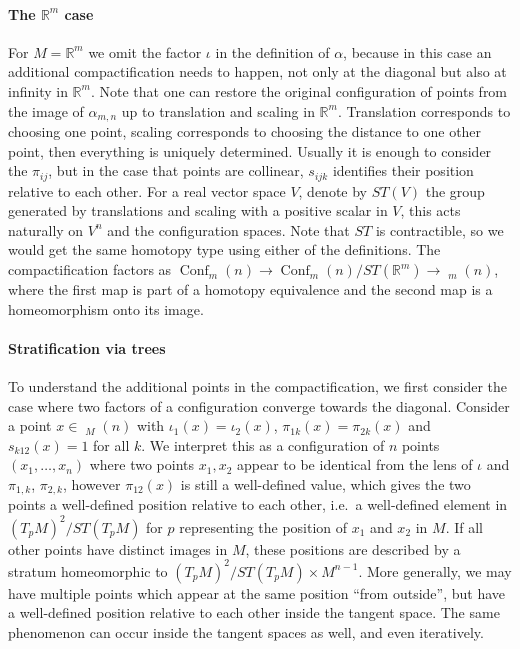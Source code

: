 \documentclass{scrartcl}
\theoremstyle{plain}
\theoremstyle{definition}
\newcommand{\R}{\mathbb R}
\DeclareMathOperator{\Conf}{Conf}
\DeclareMathOperator{\cConf}{\overline{Conf}}
\begin{document}
\paragraph{The $\R^m$ case} For $M = \R^m$ we omit the factor $\iota$ in the definition of $\alpha$, because in this case an additional compactification needs to happen, not only at the diagonal but also at infinity in $\R^m$. Note that one can restore the original configuration of points from the image of $\alpha_{m,n}$ up to translation and scaling in $\R^m$. Translation corresponds to choosing one point, scaling corresponds to choosing the distance to one other point, then everything is uniquely determined. Usually it is enough to consider the $\pi_{ij}$, but in the case that points are collinear, $s_{ijk}$ identifies their position relative to each other. For a real vector space $V$, denote by $ST(V)$ the group generated by translations and scaling with a positive scalar in $V$, this acts naturally on $V^n$ and the configuration spaces. Note that $ST$ is contractible, so we would get the same homotopy type using either of the definitions. The compactification factors as $\Conf_m(n) \to \Conf_m(n) / ST(\R^m) \to \cConf_m(n)$, where the first map is part of a homotopy equivalence and the second map is a homeomorphism onto its image. 


\paragraph{Stratification via trees} To understand the additional points in the compactification, we first consider the case where two factors of a configuration converge towards the diagonal. Consider a point $x\in \cConf_M(n)$ with $\iota_1(x) = \iota_2(x)$, $\pi_{1k}(x) = \pi_{2k}(x)$ and $s_{k12}(x) = 1$ for all $k$. We interpret this as a configuration of $n$ points $(x_1, \dots, x_n)$ where two points $x_1, x_2$ appear to be identical from the lens of $\iota$ and $\pi_{1,k}$, $\pi_{2,k}$, however $\pi_{12}(x)$ is still a well-defined value, which gives the two points a well-defined position relative to each other, i.e.\ a well-defined element in $(T_{p}M)^2/ST(T_{p}M)$ for $p$ representing the position of $x_1$ and $x_2$ in $M$. If all other points have distinct images in $M$, these positions are described by a stratum homeomorphic to $(T_{p}M)^2/ST(T_{p}M) \times M^{n-1}$. More generally, we may have multiple points which appear at the same position ``from outside'', but have a well-defined position relative to each other inside the tangent space. The same phenomenon can occur inside the tangent spaces as well, and even iteratively. 
\end{document}
